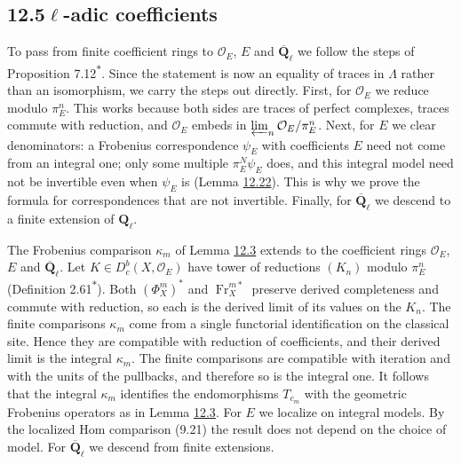 \documentclass[11pt]{article}
\newcommand{\bpout}[1]{#1\textsuperscript{\hyperlink{bp-outside}{\ensuremath{\ast}}}}
\providecommand{\Dbc}{}\renewcommand{\Dbc}{D^b_c}
\begin{document}
\subsection*{\texorpdfstring{12.5\quad $\ell$-adic coefficients}{12.5 ell-adic coefficients}}
\label{bp289}%
\label{bp290}%
To pass from finite coefficient rings to \(\mathcal O_E\), \(E\) and \(\overline{\mathbf Q}_\ell\) we follow the steps of Proposition \bpout{7.12}. Since the statement is now an equality of traces in \(\Lambda\) rather than an isomorphism, we carry the steps out directly. First, for \(\mathcal O_E\) we reduce modulo \(\pi_E^n\). This works because both sides are traces of perfect complexes, traces commute with reduction, and \(\mathcal O_E\) embeds in \(\varprojlim_n\mathcal O_E/\pi_E^n\). Next, for \(E\) we clear denominators: a Frobenius correspondence \(\psi_E\) with coefficients \(E\) need not come from an integral one; only some multiple \(\pi_E^N\psi_E\) does, and this integral model need not be invertible even when \(\psi_E\) is (Lemma \hyperref[bp294]{12.22}). This is why we prove the formula for correspondences that are not invertible. Finally, for \(\overline{\mathbf Q}_\ell\) we descend to a finite extension of \(\mathbf Q_\ell\).

The Frobenius comparison \(\kappa_m\) of Lemma \hyperref[bp234]{12.3} extends to the coefficient rings \(\mathcal O_E\), \(E\) and \(\overline{\mathbf Q}_\ell\). Let \(K\in\Dbc(X,\mathcal O_E)\) have tower of reductions \((K_n)\) modulo \(\pi_E^n\) (Definition \bpout{2.61}). Both \((\Phi_X^m)^*\) and \(\operatorname{Fr}_X^{m*}\) preserve derived completeness and commute with reduction, so each is the derived limit of its values on the \(K_n\). The finite comparisons \(\kappa_m\) come from a single functorial identification on the classical site. Hence they are compatible with reduction of coefficients, and their derived limit is the integral \(\kappa_m\). The finite comparisons are compatible with iteration and with the units of the pullbacks, and therefore so is the integral one. It follows that the integral \(\kappa_m\) identifies the endomorphisms \(T_{c_m}\) with the geometric Frobenius operators as in Lemma \hyperref[bp234]{12.3}. For \(E\) we localize on integral models. By the localized Hom comparison (9.21) the result does not depend on the choice of model. For \(\overline{\mathbf Q}_\ell\) we descend from finite extensions.
\end{document}
